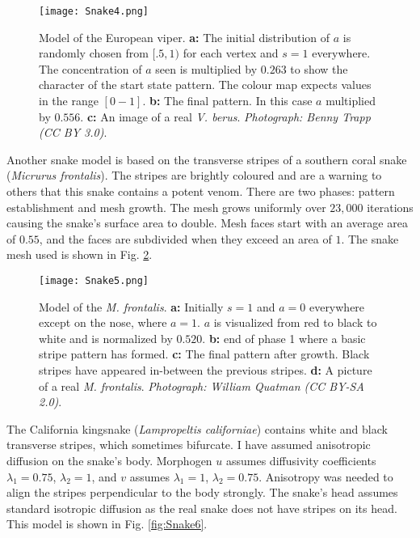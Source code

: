 \begin{figure}[ht]
	\centering
	\texttt{[image: Snake4.png]}
	\caption{Model of the European viper. \textbf{a:} The initial distribution of $a$ is randomly chosen from $[.5, 1)$ for each vertex and $s=1$ everywhere. The concentration of $a$ seen is multiplied by $0.263$ to show the character of the start state pattern. The colour map expects values in the range $[0-1]$. \textbf{b:} The final pattern. In this case $a$ multiplied by $0.556$. \textbf{c:} An image of a real \textit{V. berus}. \textit{Photograph: Benny Trapp (CC BY 3.0)}.}
	\label{fig:Snake4}
\end{figure}

\newpage
Another snake model is based on the transverse stripes of a southern coral snake (\textit{Micrurus frontalis}). The stripes are brightly coloured and are a warning to others that this snake contains a potent venom. There are two phases: pattern establishment and mesh growth. The mesh grows uniformly over $23,000$ iterations causing the snake's surface area to double. Mesh faces start with an average area of $0.55$, and the faces are subdivided when they exceed an area of $1$. The snake mesh used is shown in Fig. \ref{fig:Snake5}.

\begin{figure}[ht]
	\centering
	\texttt{[image: Snake5.png]}
	\caption{Model of the \textit{M. frontalis}. \textbf{a:} Initially $s=1$ and $a=0$ everywhere except on the nose, where $a=1$. $a$ is visualized from red to black to white and is normalized by $0.520$. \textbf{b:} end of phase 1 where a basic stripe pattern has formed. \textbf{c:} The final pattern after growth. Black stripes have appeared in-between the previous stripes. \textbf{d:} A picture of a real \textit{M. frontalis}. \textit{Photograph: William Quatman (CC BY-SA 2.0)}.}
	\label{fig:Snake5}
\end{figure}

\newpage 

The California kingsnake (\textit{Lampropeltis californiae}) contains white and black transverse stripes, which sometimes bifurcate. I have assumed anisotropic diffusion on the snake's body. Morphogen $u$ assumes diffusivity coefficients $\lambda_{1}=0.75$, $\lambda_{2}=1$, and $v$ assumes $\lambda_{1}=1$, $\lambda_{2}=0.75$. Anisotropy was needed to align the stripes perpendicular to the body strongly. The snake's head assumes standard isotropic diffusion as the real snake does not have stripes on its head. This model is shown in Fig. \ref{fig:Snake6}.


